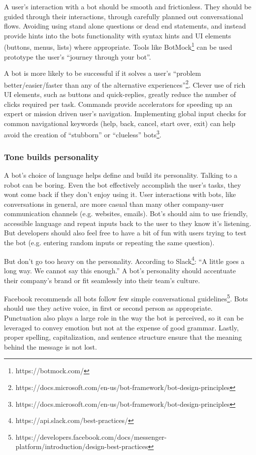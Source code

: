 \documentclass{sig-alternate}
\begin{document}
	A user's interaction with a bot should be smooth and frictionless. They should be guided through their interactions, through carefully planned out conversational flows. Avoiding using stand alone questions or dead end statements, and instead provide hints into the bots functionality with syntax hints and UI elements (buttons, menus, lists) where appropriate. Tools like BotMock\footnote{https://botmock.com/} can be used prototype the user's ``journey through your bot''.

	A bot is more likely to be successful if it solves a user's ``problem better/easier/faster than any of the alternative experiences''\footnote{https://docs.microsoft.com/en-us/bot-framework/bot-design-principles}.  Clever use of rich UI elements, such as buttons and quick-replies, greatly reduce the number of clicks required per task.  Commands provide accelerators for speeding up an expert or mission driven user's navigation.
	Implementing global input checks for common navigational keywords (help, back, cancel, start over, exit) can help avoid the creation of ``stubborn'' or ``clueless'' bots\footnote{https://docs.microsoft.com/en-us/bot-framework/bot-design-principles}. 

	\subsubsection{Tone builds personality}

	A bot's choice of language helps define and build its personality.  Talking to a robot can be boring. Even the bot effectively accomplish the user's tasks, they wont come back if they don't enjoy using it. User interactions with bots, like conversations in general, are more casual than many other company-user communication channels (e.g. websites, emails).  Bot's should aim to use friendly, accessible language and repeat inputs back to the user to they know it's listening. But developers should also feel free to have a bit of fun with users trying to test the bot (e.g. entering random inputs or repeating the same question). 

	But don't go too heavy on the personality. According to Slack\footnote{https://api.slack.com/best-practices/}: ``A little goes a long way. We cannot say this enough.'' A bot's personality should accentuate their company's brand or fit seamlessly into their team's culture.  

	Facebook recommends all bots follow few simple conversational guidelines\footnote{https://developers.facebook.com/docs/messenger-platform/introduction/design-best-practices}. Bots should use they active voice, in first or second person as appropriate.  Punctuation also plays a large role in the way the bot is perceived, so it can be leveraged to convey emotion but not at the expense of good grammar.  Lastly, proper spelling, capitalization, and sentence structure ensure that the meaning behind the message is not lost.
 
\end{document}
